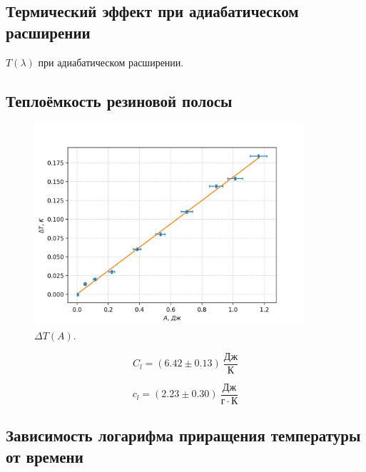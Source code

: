 \documentclass[a4paper,12pt]{article} %
\begin{document}
\FloatBarrier

\subsection*{Термический эффект при адиабатическом расширении}

\begin{table}[h!]

\caption{$T(\lambda)$ при адиабатическом расширении.}
\end{table}

\subsection*{Теплоёмкость резиновой полосы}

\begin{figure}[h!]\label{TA}
\begin{center}
\includegraphics[width=0.89\textwidth]{T(A).png}
\caption{$\Delta T(A)$.}
\end{center}
\end{figure}

\begin{equation}\label{c1}
    C_l = (6.42 \pm 0.13) \ \frac{Дж}{К}
\end{equation}

\begin{equation}\label{c2}
    c_l = (2.23 \pm 0.30) \ \frac{Дж}{г \cdot К}
\end{equation}

\FloatBarrier

\subsection*{Зависимость логарифма приращения температуры от времени}
\end{document}
